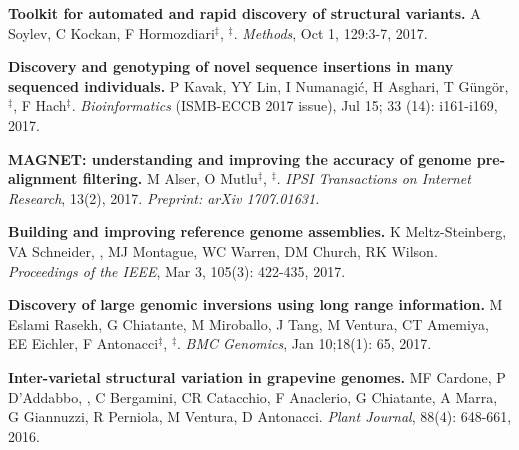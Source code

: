          \vspace{-.2cm}
         {\bf Toolkit for automated and rapid discovery of structural variants.}
          A Soylev, C Kockan, F Hormozdiari$^\ddag$, \calkan{}$^\ddag$.
          {\em Methods}, Oct 1, 129:3-7, 2017.
                                       


  \vspace{-.2cm}
                                     

         {\bf Discovery and genotyping of novel sequence insertions in many sequenced individuals.}
         P Kavak, YY Lin, I Numanagić, H Asghari, T Güngör, \calkan{}$^\ddag$, F Hach$^\ddag$.
         {\em Bioinformatics} (ISMB-ECCB 2017 issue), Jul 15; 33 (14): i161-i169, 2017.\\
         
\clearpage

  \vspace{-.2cm}
                                       
         {\bf MAGNET: understanding and improving the accuracy of genome pre-alignment filtering.}
         M Alser, O Mutlu$^\ddag$, \calkan{}$^\ddag$. 
         {\em IPSI Transactions on Internet Research}, 13(2), 2017. \textit{Preprint: arXiv 1707.01631.}


         
  \vspace{-.2cm}        
         {\bf Building and improving reference genome assemblies.} K Meltz-Steinberg, VA Schneider, \calkan{}, MJ Montague, WC Warren, DM Church, RK Wilson.
         {\em Proceedings of the IEEE}, Mar 3, 105(3): 422-435, 2017.


  \vspace{-.2cm}        
         {\bf Discovery of large genomic inversions using long range information.} M Eslami Rasekh, G Chiatante, M Miroballo, J Tang, M Ventura, CT Amemiya, EE Eichler, F Antonacci$^\ddag$, \calkan{}$^\ddag$.
         {\em BMC Genomics}, Jan 10;18(1): 65, 2017.


  \vspace{-.2cm}        
  {\bf Inter-varietal structural variation in grapevine genomes.}
 MF Cardone, P D'Addabbo, \calkan{}, C Bergamini, CR Catacchio, F Anaclerio, G Chiatante, A Marra, G Giannuzzi, R Perniola, M Ventura, D Antonacci.
 {\em Plant Journal}, 88(4): 648-661, 2016.


